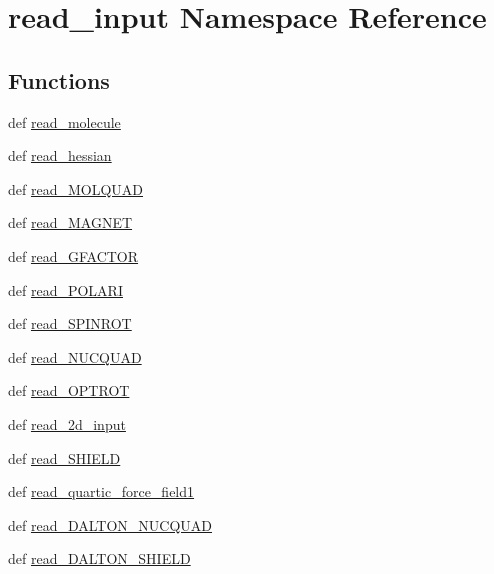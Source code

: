 \hypertarget{namespaceread__input}{\section{read\+\_\+input Namespace Reference}
\label{namespaceread__input}
}
\subsection*{Functions}
\begin{DoxyCompactItemize}
\item 
def \hyperlink{namespaceread__input_a8044a25ca166989f90bc28ea72ed7272}{read\+\_\+molecule}
\item 
def \hyperlink{namespaceread__input_ad33b518c2d8d751c205afde02365170e}{read\+\_\+hessian}
\item 
def \hyperlink{namespaceread__input_ad0bb9762c4aec6cd6804ee183811d55f}{read\+\_\+\+M\+O\+L\+Q\+U\+A\+D}
\item 
def \hyperlink{namespaceread__input_adc81b827a0cc310a3d429d393bd4d906}{read\+\_\+\+M\+A\+G\+N\+E\+T}
\item 
def \hyperlink{namespaceread__input_a2bba32ea57a1240d218dfdaceda12421}{read\+\_\+\+G\+F\+A\+C\+T\+O\+R}
\item 
def \hyperlink{namespaceread__input_a926ccdb92fd82370dfa7bba7883d5f18}{read\+\_\+\+P\+O\+L\+A\+R\+I}
\item 
def \hyperlink{namespaceread__input_af7138756561f70b3f0cdf92cf10b393d}{read\+\_\+\+S\+P\+I\+N\+R\+O\+T}
\item 
def \hyperlink{namespaceread__input_a831683736d21bb282abb8ae538d32950}{read\+\_\+\+N\+U\+C\+Q\+U\+A\+D}
\item 
def \hyperlink{namespaceread__input_a485488cc474cf816525ac3151b0975e6}{read\+\_\+\+O\+P\+T\+R\+O\+T}
\item 
def \hyperlink{namespaceread__input_ae727944c5af5d8c1eb576fea2e5e9480}{read\+\_\+2d\+\_\+input}
\item 
def \hyperlink{namespaceread__input_a3ebeb29cc6755437e0c8efa7668cb5f6}{read\+\_\+\+S\+H\+I\+E\+L\+D}
\item 
def \hyperlink{namespaceread__input_a2596d0058939865f2888683a371e6183}{read\+\_\+quartic\+\_\+force\+\_\+field1}
\item 
def \hyperlink{namespaceread__input_aaa16fddd2ee6c7e9a7f8533c16867605}{read\+\_\+\+D\+A\+L\+T\+O\+N\+\_\+\+N\+U\+C\+Q\+U\+A\+D}
\item 
def \hyperlink{namespaceread__input_a1eff34334e7b57f70439c1c70d74723c}{read\+\_\+\+D\+A\+L\+T\+O\+N\+\_\+\+S\+H\+I\+E\+L\+D}

\end{DoxyCompactItemize}
